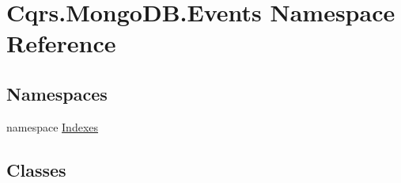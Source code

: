 \hypertarget{namespaceCqrs_1_1MongoDB_1_1Events}{}\section{Cqrs.\+Mongo\+D\+B.\+Events Namespace Reference}
\label{namespaceCqrs_1_1MongoDB_1_1Events}
\subsection*{Namespaces}
\begin{DoxyCompactItemize}
\item 
namespace \hyperlink{namespaceCqrs_1_1MongoDB_1_1Events_1_1Indexes}{Indexes}
\end{DoxyCompactItemize}
\subsection*{Classes}
